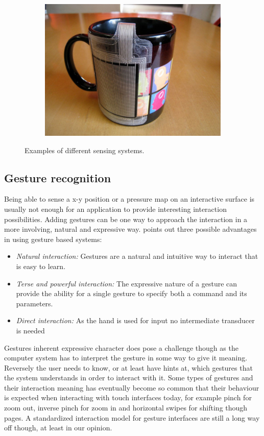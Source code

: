 \begin{figure}[h]
\begin{subfigure}[b]{.3\textwidth}
    \centering
    \includegraphics[width=0.9\linewidth]{figures/touch/unmousepad}
    \label{sofa_interaction:unmousepad}
  \end{subfigure}
  \caption{Examples of different sensing systems.}
  \label{sofa_interaction:sensing_systems}
\end{figure}

\subsection{Gesture recognition}
\label{ch:textiletouch:gesture_recognition}
Being able to sense a x-y position or a pressure map on an interactive surface is usually not enough for an application to provide interesting interaction possibilities.
Adding gestures can be one way to approach the interaction in a more involving, natural and expressive way.
\citet{baudel1993charade} points out three possible advantages in using gesture based systems:
\begin{itemize}
  \item \emph{Natural interaction:} Gestures are a natural and intuitive way to interact that is easy to learn.
  \item \emph{Terse and powerful interaction:} The expressive nature of a gesture can provide the ability for a single gesture to specify both a command and its parameters.
  \item \emph{Direct interaction:} As the hand is used for input no intermediate transducer is needed
\end{itemize}
Gestures inherent expressive character does pose a challenge though as the computer system has to interpret the gesture in some way to give it meaning.
Reversely the user needs to know, or at least have hints at, which gestures that the system understands in order to interact with it.
Some types of gestures and their interaction meaning has eventually become so common that their behaviour is expected when interacting with touch interfaces today, for example pinch for zoom out, inverse pinch for zoom in and horizontal swipes for shifting though pages.
A standardized interaction model for gesture interfaces are still a long way off though, at least in our opinion. 

